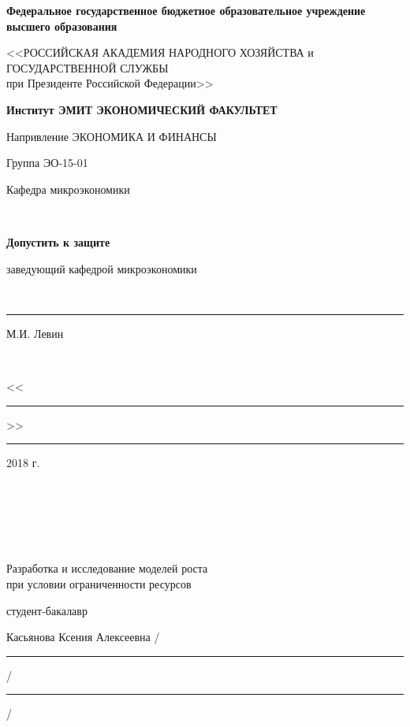 \documentclass[12pt,a4paper, oneside]{extreport}
\begin{document}

\thispagestyle{empty} %

\begingroup
{}   %
\begin{center}
\small \bfseries Федеральное государственное бюджетное образовательное учреждение высшего образования

<<РОССИЙСКАЯ АКАДЕМИЯ НАРОДНОГО ХОЗЯЙСТВА и\\ ГОСУДАРСТВЕННОЙ СЛУЖБЫ \\
при Президенте Российской Федерации>>

\vspace{2ex}

\bfseries
Институт ЭМИТ
ЭКОНОМИЧЕСКИЙ ФАКУЛЬТЕТ

Напривление  ЭКОНОМИКА И ФИНАНСЫ
\end{center}

\vfill


\noindent  Группа ЭО-15-01
\hfill
\parbox[t]{20em}{\centering
Кафедра микроэкономики

\mbox{ }

\textbf{Допустить к защите}

заведующий кафедрой микроэкономики

\mbox{ }

\rule{8em}{0.5pt} М.И. Левин

\mbox{ }

<<\rule{2em}{0.5pt}>> \rule{5em}{0.5pt} 2018 г. }

\mbox{ }

\mbox{ }


\mbox{ }

\begin{center}
{\large
Разработка и исследование моделей роста \\ при условии ограниченности ресурсов }
\end{center}

\vfill

\noindent\normalsize
студент-бакалавр

\noindent
Касьянова Ксения Алексеевна 
\hfill /\rule{6em}{0.5pt}/\rule{6em}{0.5pt}/
\end{document}
